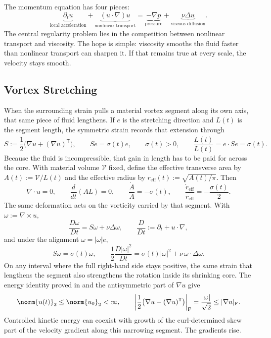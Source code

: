 
The momentum equation has four pieces:
\[
  \underbrace{\partial_t u}_{\text{local acceleration}}
  +
  \underbrace{(u\cdot\nabla)u}_{\text{nonlinear transport}}
  =
  \underbrace{-\nabla p}_{\text{pressure}}
  +
  \underbrace{\nu\Delta u}_{\text{viscous diffusion}}.
\]
The central regularity problem lies in the competition between nonlinear transport and viscosity.
The hope is simple: viscosity smooths the fluid faster than nonlinear transport can sharpen it.
If that remains true at every scale, the velocity stays smooth.

\subsection{Vortex Stretching}\label{sub:ThePerfectlyStretchingVortex}

When the surrounding strain pulls a material vortex segment along its own axis, that same piece of fluid lengthens. If \(e\) is the stretching direction and \(L(t)\) is the segment length, the symmetric strain records that extension through
\[
  S:=\frac12\bigl(\nabla u+(\nabla u)^{\mathsf T}\bigr),
  \qquad
  Se=\sigma(t)e,
  \qquad
  \sigma(t)>0,
  \qquad
  \frac{\dot L(t)}{L(t)}
  =
  e\cdot Se
  =
  \sigma(t).
\]
Because the fluid is incompressible, that gain in length has to be paid for across the core. With material volume \(\mathcal V\) fixed, define the effective transverse area by \(A(t):=\mathcal V/L(t)\) and the effective radius by \(r_{\mathrm{eff}}(t):=\sqrt{A(t)/\pi}\). Then
\[
  \nabla\cdot u=0,
  \qquad
  \frac{d}{dt}(A L)=0,
  \qquad
  \frac{\dot A}{A}=-\sigma(t),
  \qquad
  \frac{\dot r_{\mathrm{eff}}}{r_{\mathrm{eff}}}
  =
  -\frac{\sigma(t)}{2}.
\]
The same deformation acts on the vorticity carried by that segment. With \(\omega:=\nabla\times u\),
\[
  \frac{D\omega}{Dt}
  =
  S\omega+\nu\Delta\omega,
  \qquad
  \frac{D}{Dt}
  :=
  \partial_t+u\cdot\nabla,
\]
and under the alignment \(\omega=|\omega|e\),
\[
  S\omega
  =
  \sigma(t)\omega,
  \qquad
  \frac12\frac{D|\omega|^2}{Dt}
  =
  \sigma(t)|\omega|^2
  +
  \nu\,\omega\cdot\Delta\omega.
\]
On any interval where the full right-hand side stays positive, the same strain that lengthens the segment also strengthens the rotation inside its shrinking core. The energy identity proved in  and the antisymmetric part of \(\nabla u\) give
\[
  \norm{u(t)}_2
  \leq
  \norm{u_0}_2
  <\infty,
  \qquad
  \left|\frac12\bigl(\nabla u-(\nabla u)^{\mathsf T}\bigr)\right|_{\mathrm F}
  =
  \frac{|\omega|}{\sqrt2}
  \leq
  |\nabla u|_{\mathrm F}.
\]
Controlled kinetic energy can coexist with growth of the curl-determined skew part of the velocity gradient along this narrowing segment. The gradients rise.


